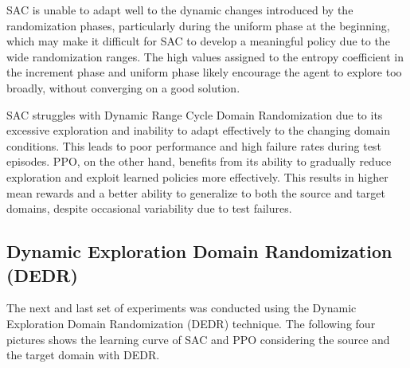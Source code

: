 \documentclass[11pt]{article}
\begin{document}
SAC is unable to adapt well to the dynamic changes introduced by the randomization phases, particularly during the uniform phase at the beginning, which may make it difficult for SAC to develop a meaningful policy due to the wide randomization ranges.
The high values assigned to the entropy coefficient in the increment phase and uniform phase likely encourage the agent to explore too broadly, without converging on a good solution. 

SAC struggles with Dynamic Range Cycle Domain Randomization due to its excessive exploration and inability to adapt effectively to the changing domain conditions. This leads to poor performance and high failure rates during test episodes.
PPO, on the other hand, benefits from its ability to gradually reduce exploration and exploit learned policies more effectively. This results in higher mean rewards and a better ability to generalize to both the source and target domains, despite occasional variability due to test failures.

\subsection{Dynamic Exploration Domain Randomization (DEDR)}

The next and last set of experiments was conducted using the Dynamic Exploration Domain Randomization (DEDR) technique. The following four pictures shows the learning curve of SAC and PPO considering the source and the target domain with DEDR.
\end{document}
